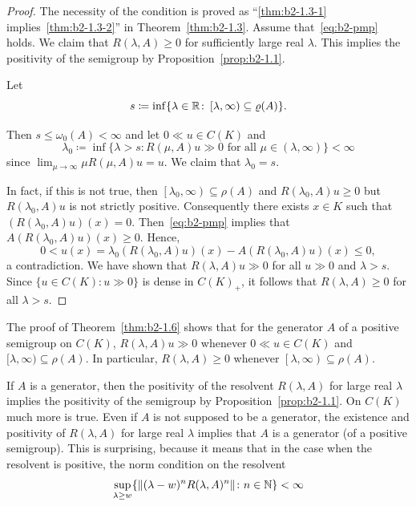 \begin{proof}
The necessity of the condition is proved as 
\enquote{\ref{thm:b2-1.3-1} implies~\ref{thm:b2-1.3-2}} in Theorem~\ref{thm:b2-1.3}.
Assume that~\eqref{eq:b2-pmp} holds.
We claim that $R(\lambda,A) \geq 0$ for sufficiently large real $\lambda$. 
This implies the positivity of the semigroup by Proposition~\ref{prop:b2-1.1}.

Let 
%
\[
	s \coloneq \inf \{\lambda \in \R \colon \left[\lambda,\infty \right) \subseteq \rho(A)\}.
\]
%

Then $s \leq \omega_{0}(A) < \infty$ and let $0 \ll u \in C(K)$ and  
\[
\lambda_{0} \coloneq \inf \{\lambda > s \colon R(\mu,A)u \gg 0 \text{ for all } \mu \in (\lambda,\infty)\} < \infty
\]
since $\lim_{\mu \to \infty} \mu R(\mu,A)u = u$.
We claim that $\lambda_{0} = s$.

In fact, if this is not true, then $\left[\lambda_{0},\infty\right) \subseteq \rho(A)$ and $R(\lambda_{0},A)u \geq 0$ but $R(\lambda_{0},A)u$ is not strictly positive.
Consequently there exists $x \in K$ such that $(R(\lambda_{0},A)u)(x) = 0$.
Then~\eqref{eq:b2-pmp} implies that $A(R(\lambda_{0},A)u)(x) \geq 0$.
Hence, 
\[
0 < u(x) = \lambda_{0}(R(\lambda_{0},A)u)(x) - A(R(\lambda_{0},A)u)(x) \leq 0,
\]
a contradiction.
We have shown that $R(\lambda,A)u \gg 0$ for all $u \gg 0$ and $\lambda > s$.
Since $\{u \in C(K) \colon u \gg 0\}$ is dense in $C(K)_{+}$, it follows that $R(\lambda,A) \geq 0$ for all $\lambda > s$.
\end{proof}
\begin{remark}\label{rem:b2-1.7}
The proof of Theorem~\ref{thm:b2-1.6} shows that for the generator $A$ of a positive semigroup on $C(K)$, $R(\lambda,A)u \gg 0$ whenever $0 \ll u \in C(K)$ and $[\lambda,\infty) \subseteq \rho(A)$.
In particular, $R(\lambda,A) \geq 0$ whenever $\left[\lambda,\infty\right) \subseteq \rho(A)$.
\end{remark}
If\/ $A$ is a generator, then the positivity of the resolvent $R(\lambda,A)$ for large real $\lambda$ implies the positivity of the semigroup by Proposition~\ref{prop:b2-1.1}.
On $C(K)$ much more is true.
Even if\/ $A$ is not supposed to be a generator, the existence and positivity of\/ $R(\lambda,A)$ for large real $\lambda$ implies that $A$ is a generator (of a positive semigroup).
This is surprising, because it means that in the case when the resolvent is positive, the norm condition on the resolvent 
\[
\sup_{\lambda \geq w} \{\Vert (\lambda-w)^{n}R(\lambda,A)^{n} \Vert \colon n \in \N \} < \infty
\]
